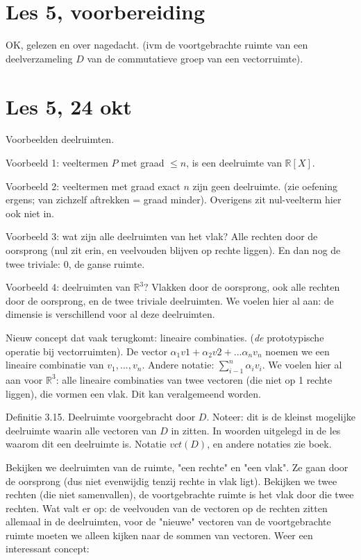 \documentclass{article}
\begin{document}
\section{Les 5, voorbereiding}
OK, gelezen en over nagedacht. (ivm de voortgebrachte ruimte van een deelverzameling $D$ van de commutatieve groep van een vectorruimte). 

\section{Les 5, 24 okt}

Voorbeelden deelruimten. 

Voorbeeld 1: veeltermen $P$ met  graad $\leq n$, is een deelruimte van $\mathbb{R}[X]$. 

Voorbeeld 2: veeltermen met graad exact $n$ zijn geen deelruimte. (zie oefening ergens; van zichzelf aftrekken = graad minder). Overigens zit nul-veelterm hier ook niet in. 

Voorbeeld 3: wat zijn alle deelruimten van het vlak? Alle rechten door de oorsprong (nul zit erin, en veelvouden blijven op rechte liggen). En dan nog de twee triviale: {0}, de ganse ruimte. 

Voorbeeld 4: deelruimten van $\mathbb{R}^3$? Vlakken door de oorsprong, ook alle rechten door de oorsprong, en de twee triviale deelruimten. We voelen hier al aan: de dimensie is verschillend voor al deze deelruimten. 

Nieuw concept dat vaak terugkomt: lineaire combinaties. (\emph{de} prototypische operatie bij vectorruimten). De vector $\alpha_1 v1 + \alpha_2 v2 + ... \alpha_n v_n$ noemen we een lineaire combinatie van $v_1, ..., v_n$. Andere notatie: $\sum_{i-1}^n \alpha_i v_i $. 
We voelen hier al aan voor $\mathbb{R}^3$: alle lineaire combinaties van twee vectoren (die niet op 1 rechte liggen), die vormen een vlak. Dit kan veralgemeend worden. 

Definitie 3.15. Deelruimte voorgebracht door $D$. Noteer: dit is de kleinst mogelijke deelruimte waarin alle vectoren van $D$ in zitten. In woorden uitgelegd in de les waarom dit een deelruimte is. Notatie $vct(D)$, en andere notaties zie boek. 

Bekijken we deelruimten van de ruimte, "een rechte" en "een vlak". Ze gaan door de oorsprong (dus niet evenwijdig tenzij rechte in vlak ligt). Bekijken we twee rechten (die niet samenvallen), de voortgebrachte ruimte is het vlak door die twee rechten. Wat valt er op: de veelvouden van de vectoren op de rechten zitten allemaal in de deelruimten, voor de "nieuwe" vectoren van de voortgebrachte ruimte moeten we alleen kijken naar de sommen van vectoren. Weer een interessant concept: 
\end{document}
